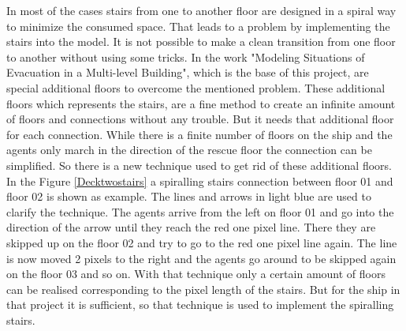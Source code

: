 \documentclass[11pt]{article}
\begin{document}
In most of the cases stairs from one to another floor are designed in a spiral way to minimize the consumed space. That leads to a problem by implementing the stairs into the model. It is not possible to make a clean transition from one floor to another without using some tricks.
\newline
In the work "Modeling Situations of Evacuation in a Multi-level Building"\cite{Building}, which is the base of this project, are special additional floors to overcome the mentioned problem. These additional floors which represents the stairs, are a fine method to create an infinite amount of floors and connections without any trouble. But it needs that additional floor for each connection.
\newline
While there is a finite number of floors on the ship and the agents only march in the direction of the rescue floor the connection can be simplified. So there is a new technique used to get rid of these additional floors.
\newline
In the Figure \ref{Decktwostairs} a spiralling stairs connection between floor 01 and floor 02 is shown as example. The lines and arrows in light blue are used to clarify the technique.
The agents arrive from the left on floor 01 and go into the direction of the arrow until they reach the red one pixel line. There they are skipped up on the floor 02 and try to go to the red one pixel line again. The line is now moved 2 pixels to the right and the agents go around to be skipped again on the floor 03 and so on.
With that technique only a certain amount of floors can be realised corresponding to the pixel length of the stairs. But for the ship in that project it is sufficient, so that technique is used to implement the spiralling stairs.
\end{document}
